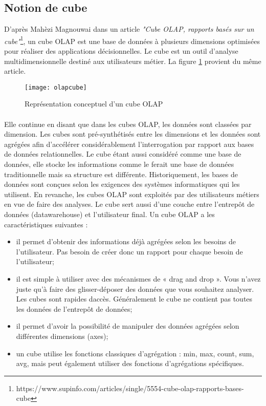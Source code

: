 \subsection{Notion de cube}
D'après Mahèzi Magnouwai dans un article \textit{"Cube OLAP, rapports basés sur un cube"}\footnote{https://www.supinfo.com/articles/single/5554-cube-olap-rapports-bases-cube}, un cube OLAP est une base de données à plusieurs dimensions optimisées pour réaliser des applications décisionnelles. Le cube est un outil d’analyse multidimensionnelle destiné aux utilisateurs métier. La figure \ref{fig:olapcube} provient du même article.

\begin{figure}[H]
    \centering
    \texttt{[image: olapcube]}
    \caption{Représentation conceptuel d'un cube OLAP}
    \label{fig:olapcube}
\end{figure}

\paragraph{}
Elle continue en disant que dans les cubes OLAP, les données sont classées par dimension. Les cubes sont pré-synthétisés entre les dimensions et les données sont agrégées afin d’accélérer considérablement l’interrogation par rapport aux bases de données relationnelles. Le cube étant aussi considéré comme une base de données, elle stocke les informations comme le ferait une base de données traditionnelle mais sa structure est différente. Historiquement, les bases de données sont conçues selon les exigences des systèmes informatiques qui les utilisent. En revanche, les cubes OLAP sont exploités par des utilisateurs métiers en vue de faire des analyses. Le cube sert aussi d’une couche entre l’entrepôt de données (datawarehouse) et l’utilisateur final. Un cube OLAP a les caractéristiques suivantes :
\begin{itemize}
    \item il permet d’obtenir des informations déjà agrégées selon les besoins de l’utilisateur. Pas besoin de créer donc un rapport pour chaque besoin de l’utilisateur;
    \item il est simple à utiliser avec des mécanismes de « drag and drop ». Vous n’avez juste qu’à faire des glisser-déposer des données que vous souhaitez analyser. Les cubes sont rapides daccès. Généralement le cube ne contient pas toutes les données de l’entrepôt de données;
    \item il permet d'avoir la possibilité de manipuler des données agrégées selon différentes dimensions (axes);
    \item un cube utilise les fonctions classiques d’agrégation : min, max, count, sum, avg, mais peut également utiliser des fonctions d’agrégations spécifiques.
\end{itemize}
